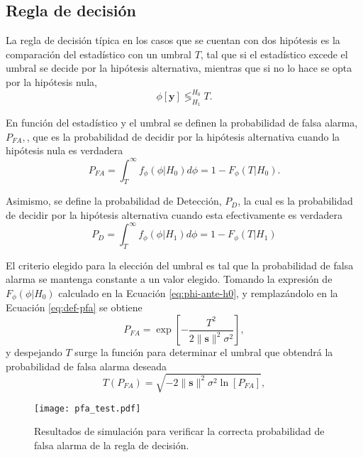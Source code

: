 \subsection{Regla de decisión}
\label{Ss:hipotesis-umbral}\label{eq:def-pfa}

La regla de decisión típica en los casos que se cuentan con dos hipótesis es la comparación del estadístico con un umbral $T$, tal que si el estadístico excede el umbral se decide por la hipótesis alternativa, mientras que si no lo hace se opta por la hipótesis nula,
\begin{equation}
    \phi[\mathbf{y}]\mathop{\lessgtr}_{H_1}^{H_0}T.
\end{equation}

En función del estadístico y el umbral se definen la probabilidad de falsa alarma, $P_{FA},$, que es la probabilidad de decidir por la hipótesis alternativa cuando la hipótesis nula es verdadera
\begin{equation}
    P_{FA} = \int_T^\infty f_\phi(\phi|H_0)d\phi = 1 - F_\phi(T|H_0).
\end{equation}

Asimismo, se define la probabilidad de Detección, $P_D$, la cual es la probabilidad de decidir por la hipótesis alternativa cuando esta efectivamente es verdadera
\begin{equation}\label{eq:probabilidad-deteccion-def}
    P_{D} = \int_T^\infty f_\phi(\phi|H_1)d\phi = 1 - F_\phi(T|H_1)
\end{equation}

El criterio elegido para la elección del umbral es tal que la probabilidad de falsa alarma se mantenga constante a un valor elegido. Tomando la expresión de $F_\phi(\phi|H_0)$ calculado en la Ecuación \ref{eq:phi-ante-h0}, y remplazándolo en la Ecuación \ref{eq:def-pfa} se obtiene
\begin{equation}
    P_{FA} = \exp\left[-\frac{T^2}{2\lVert\mathbf{s}\rVert^2 \sigma^2}\right],    
\end{equation}
y despejando $T$ surge la función para determinar el umbral que obtendrá la probabilidad de falsa alarma deseada
\begin{equation}\label{eq:umbral}
    T(P_{FA}) = \sqrt{-2\lVert \mathbf{s}\rVert^2 \sigma^2 \ln\left[P_{FA}\right]}    ,
\end{equation}

\begin{figure}[t]
    \centering{}\texttt{[image: pfa\_test.pdf]}
    \caption{Resultados de simulación para verificar la correcta probabilidad de falsa alarma de la regla de decisión.\label{fig:pfa-test}}  
\end{figure}

